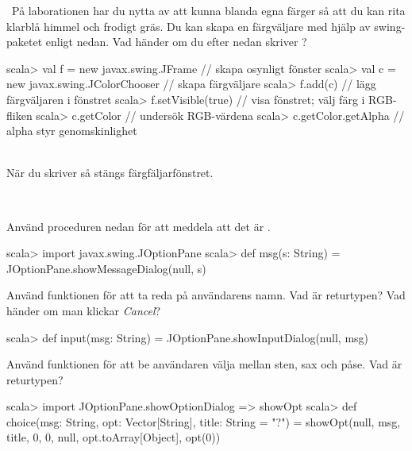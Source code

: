 \QUESTEND





\AdvancedTasks %







\QUESTBEGIN

\Task \what~På laborationen har du nytta av att kunna blanda egna färger så att du kan rita klarblå himmel och frodigt gräs. Du kan skapa en färgväljare med hjälp av swing-paketet enligt nedan. Vad händer om du efter nedan skriver ?

\begin{REPL}
scala> val f = new javax.swing.JFrame         // skapa osynligt fönster
scala> val c = new javax.swing.JColorChooser  // skapa färgväljare
scala> f.add(c)              // lägg färgväljaren i fönstret
scala> f.setVisible(true)    // visa fönstret; välj färg i RGB-fliken
scala> c.getColor            // undersök RGB-värdena
scala> c.getColor.getAlpha   // alpha styr genomskinlighet
\end{REPL}


\SOLUTION

\TaskSolved \what~\\När du skriver  så stängs färgfäljarfönstret.

\QUESTEND



\QUESTBEGIN

\Task \what~

\Subtask Använd proceduren  nedan för att meddela att det är .
\begin{REPL}
scala> import javax.swing.JOptionPane
scala> def msg(s: String) = JOptionPane.showMessageDialog(null, s)
\end{REPL}

\Subtask Använd funktionen  för att ta reda på användarens namn. Vad är returtypen? Vad händer om man klickar \emph{Cancel}?
\begin{REPL}
scala> def input(msg: String) = JOptionPane.showInputDialog(null, msg)
\end{REPL}

\Subtask Använd funktionen  för att be användaren välja mellan sten, sax och påse. Vad är returtypen?
\begin{REPL}
scala> import JOptionPane.{showOptionDialog => showOpt}
scala> def choice(msg: String, opt: Vector[String], title: String = "?") =
  showOpt(null, msg, title, 0, 0, null, opt.toArray[Object], opt(0))
\end{REPL}


